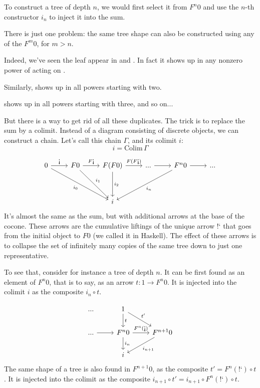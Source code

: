 \documentclass[DaoFP]{subfiles}
\begin{document}
To construct a tree of depth $n$, we would first select it from $F^n 0$ and use the $n$-th constructor $i_n$ to inject it into the sum. 

There is just one problem: the same tree shape can also be constructed using any of the $F^m 0$, for $m > n$. 

Indeed, we've seen the leaf  appear in  and . In fact it shows up in any nonzero power of  acting on . 

Similarly,  shows up in all powers starting with two.

 shows up in all powers starting with three, and so on...

But there is a way to get rid of all these duplicates. The trick is to replace the sum by a colimit. Instead of a diagram consisting of discrete objects, we can construct a chain. Let's call this chain $\Gamma$, and its colimit $i$:
\[i = \text{Colim} \, \Gamma \]

\[
 \begin{tikzcd}
 0
 \arrow[r, "\mbox{!`}"]
 \arrow[ddrr, "i_0"']
 & F 0
  \arrow[r, "F\mbox{!`}"]
 \arrow[ddr, "i_1"]
& F (F 0)
  \arrow[r, "F(F\mbox{!`})"]
  \arrow[dd, "i_2"]
 & ...
 \arrow[r]
 & F^n 0
  \arrow[r]
 \arrow[ddll, "i_n"]
 & ...
 \\
 \\
 &&i
  \end{tikzcd}
\]
It's almost the same as the sum, but with additional arrows at the base of the cocone. These arrows are the cumulative liftings of the unique arrow $\mbox{!`}$ that goes from the initial object to $F 0$ (we called it  in Haskell). The effect of these arrows is to collapse the set of infinitely many copies of the same tree down to just one representative. 

To see that, consider for instance a tree of depth $n$. It can be first found as an element of $F^n 0$, that is to say, as an arrow $t \colon 1 \to F^n 0$. It is injected into the colimit $i$ as the composite $i_n \circ t$. 

\[
 \begin{tikzcd}
 ...
& 1
\arrow[d, "t"]
\arrow[dr, "t'"]
 \\
 ...
 \arrow[r]
 & F^n 0 
 \arrow[r, "F^n (\mbox{!`})"]
 \arrow[d, "i_n"]
 & F^{n+1} 0
 \arrow[dl, "i_{n+1}"]
 \\
 &  i
  \end{tikzcd}
\]
The same shape of a tree is also found in $F^{n+1} 0$, as the composite $t' = F^n (\mbox{!`}) \circ t$. It is injected into the colimit as the composite $i_{n+1} \circ t' = i_{n+1} \circ F^n (\mbox{!`}) \circ t$. 
\end{document}
